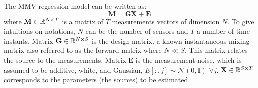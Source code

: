 The MMV regression model can be written as: 
\begin{equation} \label{mmv}
    \mathbf{M} = \mathbf{GX + E}
\end{equation}
where $\mathbf{M}\in\mathbb{R}^{N\times T}$ is a matrix of $T$ measurements vectors of dimension $N$. %
To give intuitions on notations, $N$ can be the number of sensors and $T$ a number of time instants. Matrix $\mathbf{G}\in\mathbb{R}^{N\times S}$ is the design matrix, a known instantaneous mixing matrix also referred to as the forward matrix where $N \ll S$. This matrix relates the source to the measurements. Matrix $\mathbf{E}$ is the measurement noise, which is assumed to be additive, white, and Gaussian, $E[:, j] \sim \mathcal{N}(0, \mathbf{I})$ $\forall j$.  $\mathbf{X}\in\mathbb{R}^{S\times T}$ corresponds to the parameters (the sources) to be estimated.

